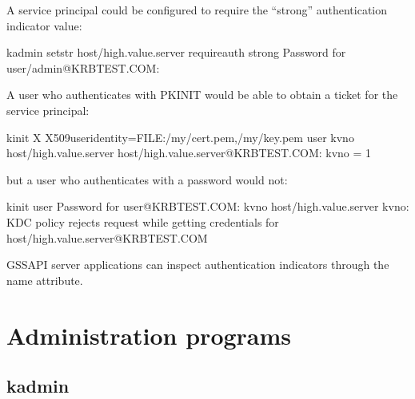 \documentclass[letterpaper,10pt,english]{sphinxmanual}
\begin{document}
%
\begin{sphinxVerbatim}[commandchars=\\\{\}]
  
\end{sphinxVerbatim}

A service principal could be configured to require the “strong”
authentication indicator value:

%
\begin{sphinxVerbatim}[commandchars=\\\{\}]
\PYGZdl{} kadmin setstr host/high.value.server require\PYGZus{}auth strong
Password for user/admin@KRBTEST.COM:
\end{sphinxVerbatim}

A user who authenticates with PKINIT would be able to obtain a ticket
for the service principal:

%
\begin{sphinxVerbatim}[commandchars=\\\{\}]
\PYGZdl{} kinit \PYGZhy{}X X509\PYGZus{}user\PYGZus{}identity=FILE:/my/cert.pem,/my/key.pem user
\PYGZdl{} kvno host/high.value.server
host/high.value.server@KRBTEST.COM: kvno = 1
\end{sphinxVerbatim}

but a user who authenticates with a password would not:

%
\begin{sphinxVerbatim}[commandchars=\\\{\}]
\PYGZdl{} kinit user
Password for user@KRBTEST.COM:
\PYGZdl{} kvno host/high.value.server
kvno: KDC policy rejects request while getting credentials for
  host/high.value.server@KRBTEST.COM
\end{sphinxVerbatim}

GSSAPI server applications can inspect authentication indicators
through the  name
attribute.


\chapter{Administration  programs}
\label{\detokenize{admin/admin_commands/index:administration-programs}}\label{\detokenize{admin/admin_commands/index::doc}}

\section{kadmin}
\label{\detokenize{admin/admin_commands/kadmin_local::doc}}\label{\detokenize{admin/admin_commands/kadmin_local:kadmin}}\label{\detokenize{admin/admin_commands/kadmin_local:kadmin-1}}
\end{document}
